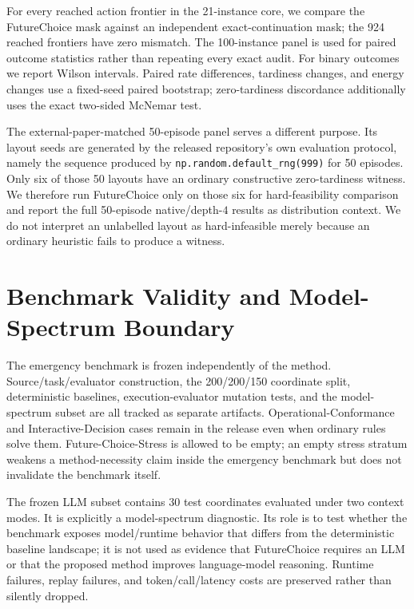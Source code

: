 For every reached action frontier in the 21-instance core, we compare the FutureChoice mask against an independent exact-continuation mask; the 924 reached frontiers have zero mismatch. The 100-instance panel is used for paired outcome statistics rather than repeating every exact audit. For binary outcomes we report Wilson intervals. Paired rate differences, tardiness changes, and energy changes use a fixed-seed paired bootstrap; zero-tardiness discordance additionally uses the exact two-sided McNemar test.

The external-paper-matched 50-episode panel serves a different purpose. Its layout seeds are generated by the released repository's own evaluation protocol, namely the sequence produced by \texttt{np.random.default\_rng(999)} for 50 episodes. Only six of those 50 layouts have an ordinary constructive zero-tardiness witness. We therefore run FutureChoice only on those six for hard-feasibility comparison and report the full 50-episode native/depth-$4$ results as distribution context. We do not interpret an unlabelled layout as hard-infeasible merely because an ordinary heuristic fails to produce a witness.

\section{Benchmark Validity and Model-Spectrum Boundary}
\label{app:benchmark}

The emergency benchmark is frozen independently of the method. Source/task/evaluator construction, the 200/200/150 coordinate split, deterministic baselines, execution-evaluator mutation tests, and the model-spectrum subset are all tracked as separate artifacts. Operational-Conformance and Interactive-Decision cases remain in the release even when ordinary rules solve them. Future-Choice-Stress is allowed to be empty; an empty stress stratum weakens a method-necessity claim inside the emergency benchmark but does not invalidate the benchmark itself.

The frozen LLM subset contains 30 test coordinates evaluated under two context modes. It is explicitly a model-spectrum diagnostic. Its role is to test whether the benchmark exposes model/runtime behavior that differs from the deterministic baseline landscape; it is not used as evidence that FutureChoice requires an LLM or that the proposed method improves language-model reasoning. Runtime failures, replay failures, and token/call/latency costs are preserved rather than silently dropped.
